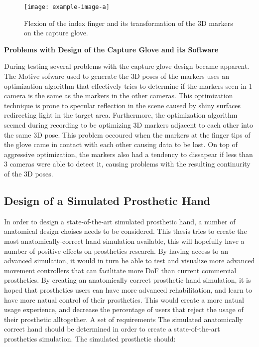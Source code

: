 \documentclass[../main.tex]{subfiles}
\begin{document}
\begin{center}
\begin{figure}[h]
\texttt{[image: example-image-a]}
\caption{Flexion of the index finger and its transformation of the 3D markers on the capture glove.}
\label{fig:glove_flex}
\end{figure}
\end{center}

\textbf{Problems with Design of the Capture Glove and its Software}

During testing several problems with the capture glove design became apparent.
The Motive sofware used to generate the 3D poses of the markers uses an optimization algorithm that effectively tries to determine if the markers seen in 1 camera is the same as the markers in the other cameras.
This optimization technique is prone to specular reflection in the scene caused by shiny surfaces redirecting light in the target area.
Furthermore, the optimization algorithm seemed during recording to be optimizing 3D markers adjacent to each other into the same 3D pose.
This problem occoured when the markers at the finger tips of the glove came in contact with each other causing data to be lost.
On top of aggressive optimization, the markers also had a tendency to dissapear if less than 3 cameras were able to detect it, causing problems with the resulting continurity of the 3D poses. 


\subsection{Design of a Simulated Prosthetic Hand}
\label{sec:prost_sim}

In order to design a state-of-the-art simulated prosthetic hand, a number of anatomical design choises needs to be considered.
This thesis tries to create the most anatomically-correct hand simulation available, this will hopefully have a number of positive effects on prosthetics research.
By having access to an advanced simulation, it would in turn be able to test and visualize more advanced movement controllers that can facilitate more DoF than current commercial prosthetics. 
By creating an anatomically correct prosthetic hand simulation, it is hoped that prosthetics users can have more advanced rehabilitation, and learn to have more natual control of their prosthetics. This would create a more natual usage experience, and decrease the percentage of users that reject the usage of their prosthetic alltogether.
A set of requirements The simulated anatomically correct hand should be determined in order to create a state-of-the-art prosthetics simulation.
The simulated prosthetic should:
\end{document}

